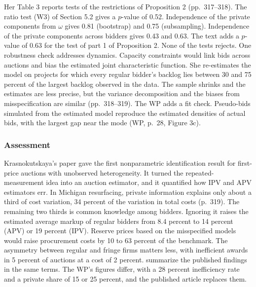 Her Table 3 reports tests of the restrictions of Proposition 2 (pp.~317--318). The ratio test (W3)
of Section 5.2 gives a $p$-value of 0.52. Independence of the private components from $\omega$ gives
0.81 (bootstrap) and 0.75 (subsampling). Independence of the private components across bidders gives
0.43 and 0.63. The text adds a $p$-value of 0.63 for the test of part 1 of Proposition 2. None of the
tests rejects.
One robustness check addresses dynamics. Capacity constraints would link bids across auctions and bias
the estimated joint characteristic function. She re-estimates the model on projects for which every
regular bidder's backlog lies between 30 and 75 percent of the largest backlog observed in the data.
The sample shrinks and the estimates are less precise, but the variance decomposition and the biases
from misspecification are similar (pp.~318--319). The WP adds a fit check. Pseudo-bids simulated from
the estimated model reproduce the estimated densities of actual bids, with the largest gap near the
mode (WP, p.~28, Figure 3c).

\subsubsection{Assessment}

Krasnokutskaya's paper gave the first nonparametric identification result for first-price auctions
with unobserved heterogeneity. It turned the repeated-measurement idea into an auction estimator, and it
quantified how IPV and APV estimators err. In Michigan resurfacing, private information explains only
about a third of cost variation, 34 percent of the variation in total costs (p.~319). The remaining
two thirds is common knowledge among bidders. Ignoring it raises the estimated average markup of
regular bidders from 8.4 percent to 14 percent (APV) or 19 percent (IPV). Reserve prices based on the
misspecified models would raise procurement costs by 10 to 63 percent of the benchmark. The asymmetry
between regular and fringe firms matters less, with inefficient awards in 5 percent of auctions at a
cost of 2 percent. \citet[p.~103]{HortacsuPerrigne2021} summarize the published findings in the same
terms. The WP's figures differ, with a 28 percent inefficiency rate and a private share of 15 or 25
percent, and the published article replaces them.

